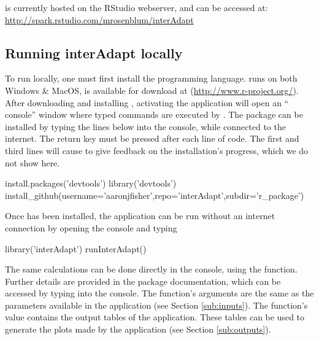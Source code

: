 \documentclass[article]{jss}
\begin{document}
 is currently hosted on the RStudio webserver, and can be accessed at:\\
\url{http://spark.rstudio.com/mrosenblum/interAdapt}

\subsection{Running interAdapt locally}
\label{sub:running-locally}



To run  locally, one must first install the  programming language.  runs on both Windows \& MacOS, is available for download at (\url{http://www.r-project.org/}). After downloading and installing , activating the  application will open an `` console'' window where typed commands are executed by . The   package can be installed by typing the lines below into the  console, while connected to the internet. The return key must be pressed after each line of code. The first and third lines will cause  to give feedback on the installation's progress, which we do not show here.

\vspace{5 mm}
\begin{Code}
install.packages('devtools')
library('devtools')
install_github(username='aaronjfisher',repo='interAdapt',subdir='r_package')
\end{Code}
\vspace{5 mm}

Once  has been installed, the  application can be run without an internet connection by opening the  console and typing

\vspace{5 mm}
\begin{Code}
library('interAdapt')
runInterAdapt()
\end{Code}
\vspace{5 mm}


The same calculations can be done directly in the  console, using the  function. Further details are provided in the  package documentation, which can be accessed by typing  into the  console. 
The function's arguments are the same as the parameters available in the
 application (see Section \ref{sub:inputs}).
The function's value contains the output tables of the  application.
These tables can be used to generate the plots made by the application
(see Section \ref{sub:outputs}).
\end{document}
